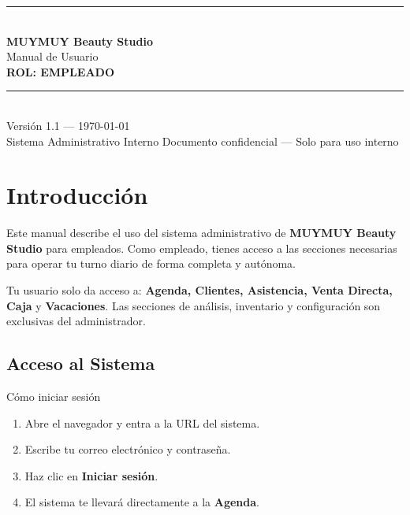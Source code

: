 \documentclass[12pt,a4paper]{article}
\begin{document}
\begin{titlepage}
  \centering
  \vspace*{4cm}
  {\color{primario}\rule{\linewidth}{1pt}}\\[1cm]
  {\color{oscuro}\Huge\bfseries MUYMUY Beauty Studio}\\[0.5cm]
  {\color{primario}\Large Manual de Usuario}\\[0.3cm]
  {\color{oscuro}\LARGE\bfseries ROL: EMPLEADO}\\[1cm]
  {\color{primario}\rule{\linewidth}{1pt}}\\[2cm]
  {\color{gris}\large Versión 1.1 --- \today}\\[0.5cm]
  {\color{gris}\normalsize Sistema Administrativo Interno}
  \vfill
  {\color{oscuro}\small Documento confidencial --- Solo para uso interno}
\end{titlepage}
\nopagecolor

\tableofcontents
\newpage

\section{Introducción}

Este manual describe el uso del sistema administrativo de \textbf{MUYMUY Beauty Studio} para empleados. Como empleado, tienes acceso a las secciones necesarias para operar tu turno diario de forma completa y autónoma.

\begin{notabox}
Tu usuario solo da acceso a: \textbf{Agenda, Clientes, Asistencia, Venta Directa, Caja} y \textbf{Vacaciones}. Las secciones de análisis, inventario y configuración son exclusivas del administrador.
\end{notabox}

\subsection{Acceso al Sistema}

\begin{pasobox}{Cómo iniciar sesión}
\begin{enumerate}[leftmargin=*]
  \item Abre el navegador y entra a la URL del sistema.
  \item Escribe tu correo electrónico y contraseña.
  \item Haz clic en \textbf{Iniciar sesión}.
  \item El sistema te llevará directamente a la \textbf{Agenda}.
\end{enumerate}
\end{pasobox}
\end{document}
